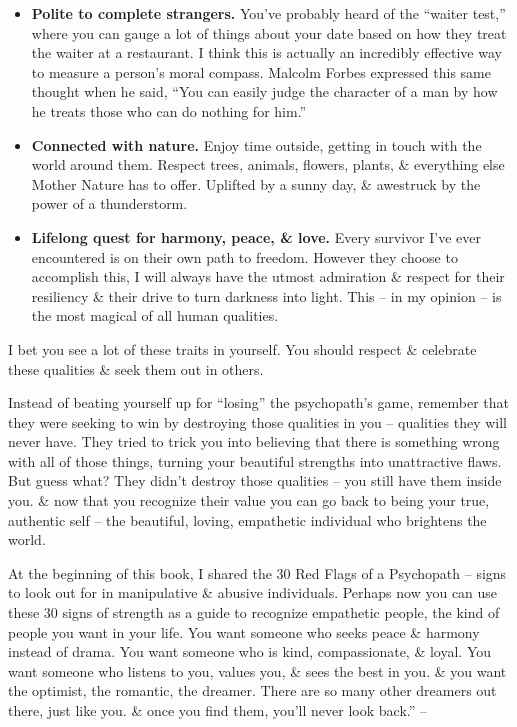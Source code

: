 \documentclass{article}
\numberwithin{equation}{section}
\begin{document}
\begin{itemize}
	\item \textbf{Polite to complete strangers.} You've probably heard of the ``waiter test,'' where you can gauge a lot of things about your date based on how they treat the waiter at a restaurant. I think this is actually an incredibly effective way to measure a person's moral compass. Malcolm Forbes expressed this same thought when he said, ``You can easily judge the character of a man by how he treats those who can do nothing for him.''
	\item \textbf{Connected with nature.} Enjoy time outside, getting in touch with the world around them. Respect trees, animals, flowers, plants, \& everything else Mother Nature has to offer. Uplifted by a sunny day, \& awestruck by the power of a thunderstorm.
	\item \textbf{Lifelong quest for harmony, peace, \& love.} Every survivor I've ever encountered is on their own path to freedom. However they choose to accomplish this, I will always have the utmost admiration \& respect for their resiliency \& their drive to turn darkness into light. This -- in my opinion -- is the most magical of all human qualities.
\end{itemize}
I bet you see a lot of these traits in yourself. You should respect \& celebrate these qualities \& seek them out in others.

Instead of beating yourself up for ``losing'' the psychopath's game, remember that they were seeking to win by destroying those qualities in you -- qualities they will never have. They tried to trick you into believing that there is something wrong with all of those things, turning your beautiful strengths into unattractive flaws. But guess what? They didn't destroy those qualities -- you still have them inside you. \& now that you recognize their value you can go back to being your true, authentic self -- the beautiful, loving, empathetic individual who brightens the world.

At the beginning of this book, I shared the 30 Red Flags of a Psychopath -- signs to look out for in manipulative \& abusive individuals. Perhaps now you can use these 30 signs of strength as a guide to recognize empathetic people, the kind of people you want in your life. You want someone who seeks peace \& harmony instead of drama. You want someone who is kind, compassionate, \& loyal. You want someone who listens to you, values you, \& sees the best in you. \& you want the optimist, the romantic, the dreamer. There are so many other dreamers out there, just like you. \& once you find them, you'll never look back.'' -- \cite[pp. 170--175]{MacKenzie2015}
\end{document}
